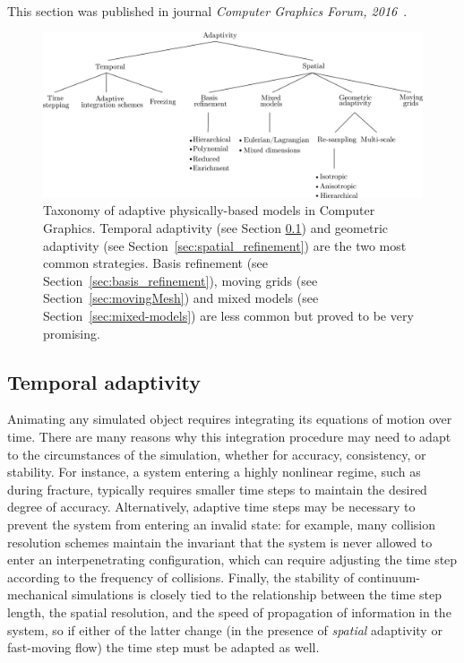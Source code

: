 \paragraph*{}
This section was published in journal \emph{Computer Graphics Forum, 2016}~\cite{Manteaux2016}.
\begin{figure}[!h]
	\centering
	\includegraphics[width=\linewidth]{images/starAdaptivity-cgf2016/taxonomy.png}
	\caption[STAR adaptivity: Taxonomy]{\label{fig:taxonomy}Taxonomy of adaptive physically-based models in Computer Graphics. Temporal adaptivity (see Section \ref{sec t adaptivity}) and geometric adaptivity (see Section~\ref{sec:spatial_refinement}) are the two most common strategies. Basis refinement (see Section~\ref{sec:basis_refinement}), moving grids (see Section~\ref{sec:movingMesh}) and mixed models (see Section~\ref{sec:mixed-models}) are less common but proved to be very promising.}
\end{figure}

\subsection{Temporal adaptivity} \label{sec t adaptivity}
Animating any simulated object requires integrating its equations of motion over time.
There are many reasons why this integration procedure may need to adapt to the circumstances of the simulation, whether for accuracy, consistency, or stability.
For instance, a system entering a highly nonlinear regime, such as during fracture, typically requires smaller time steps to maintain the desired degree of accuracy.
Alternatively, adaptive time steps may be necessary to prevent the system from entering an invalid state: for example, many collision resolution schemes maintain the invariant that the system is never allowed to enter an interpenetrating configuration, which can require adjusting the time step according to the frequency of collisions.
Finally, the stability of continuum-mechanical simulations is closely tied to the relationship between the time step length, the spatial resolution, and the speed of propagation of information in the system, so if either of the latter change (in the presence of \emph{spatial} adaptivity or fast-moving flow) the time step must be adapted as well.

